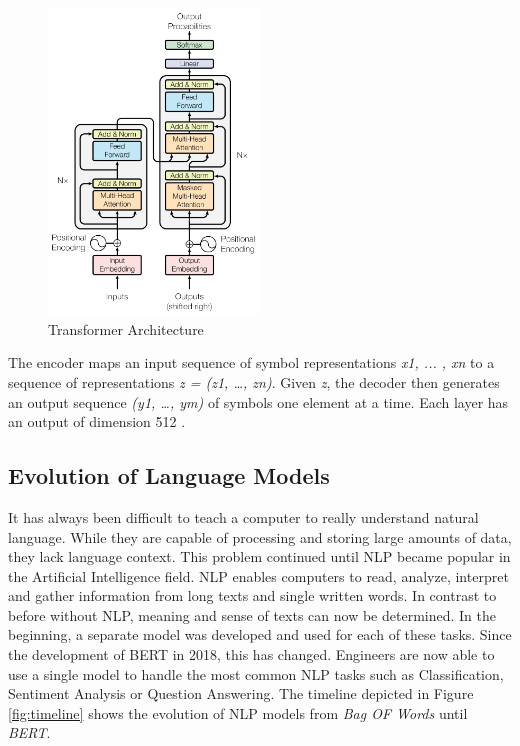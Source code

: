 \begin{figure}[H]
	\centering
	\includegraphics[width=0.5\textwidth]{figures/transformer_architecture.png}
	\caption{Transformer Architecture}
	\label{fig:transformer}
\end{figure}

The encoder maps an input sequence of symbol representations \textit{x1, ... , xn} to a sequence of representations \textit{z = (z1, …, zn)}. Given \textit{z}, the decoder then generates an output sequence \textit{(y1, …, ym)} of symbols one element at a time. Each layer has an output of dimension 512 \cite{Vaswani}.

\subsection{Evolution of Language Models}
It has always been difficult to teach a computer to really understand natural language. While they are capable of processing and storing large amounts of data, they lack language context. This problem continued until NLP became popular in the Artificial Intelligence field. NLP enables computers to read, analyze, interpret and gather information from long texts and single written words. In contrast to before without NLP, meaning and sense of texts can now be determined. In the beginning, a separate model was developed and used for each of these tasks. Since the development of BERT in 2018, this has changed. Engineers are now able to use a single model to handle the most common NLP tasks such as Classification, Sentiment Analysis or Question Answering. The timeline depicted in Figure \ref{fig:timeline} shows the evolution of NLP models from \textit{Bag OF Words} until \textit{BERT}.

